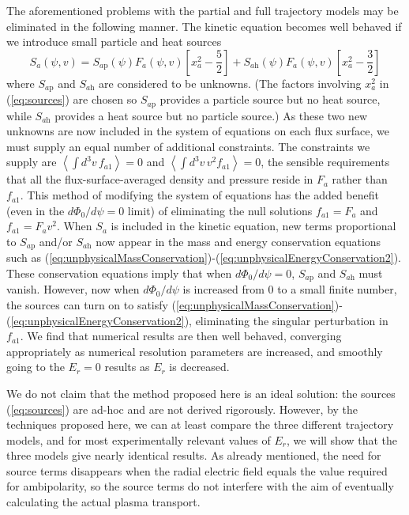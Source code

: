 \documentclass[12pt]{revtex4}
\newcommand{\Sap}{S_{a\mathrm{p}}}
\newcommand{\Sah}{S_{a\mathrm{h}}}
\begin{document}
The aforementioned problems with the partial and full trajectory models may be eliminated 
in the following manner.
The kinetic equation becomes well behaved if we introduce small particle and heat sources
\begin{equation}
S_a(\psi, v) = \Sap(\psi) F_{a}(\psi,v) \left[ x_a^2 - \frac{5}{2}\right] + \Sah(\psi) F_a(\psi, v) \left[x_a^2 - \frac{3}{2}\right]
\label{eq:sources}
\end{equation}
where $\Sap$ and $\Sah$ are considered to be unknowns.
(The factors involving $x_a^2$ in (\ref{eq:sources}) are chosen so $\Sap$ provides a particle source but no heat source, while $\Sah$ provides
a heat source but no particle source.)
As these two new unknowns are now included in the system of equations on each flux surface, we must supply an equal number of additional constraints.
The constraints we supply are $\left< \int d^3v\, f_{a1}\right>=0$ and $\left< \int d^3v\, v^2 f_{a1}\right>=0$,
the sensible requirements that all the flux-surface-averaged density and pressure reside in $F_a$ rather than $f_{a1}$.
This method of modifying the system of equations has the added benefit 
(even in the $d\Phi_0/d\psi=0$ limit)
of eliminating the null solutions $f_{a1} = F_a$ and $f_{a1} = F_a v^2$.
When $S_a$ is included in the kinetic equation, new terms proportional to $\Sap$ and/or $\Sah$
now appear in the mass and energy conservation equations such as (\ref{eq:unphysicalMassConservation})-(\ref{eq:unphysicalEnergyConservation2}).
These conservation equations imply that when $d\Phi_0/d\psi=0$, $\Sap$ and $\Sah$ must vanish.
However, now when $d\Phi_0/d\psi$ is increased from 0 to a small finite number, the sources can turn on
to satisfy  (\ref{eq:unphysicalMassConservation})-(\ref{eq:unphysicalEnergyConservation2}),
eliminating the singular perturbation in $f_{a1}$.  We find that numerical results are then well behaved,
converging appropriately as numerical resolution parameters are increased, and smoothly going to the
$E_r=0$ results as $E_r$ is decreased.

We do not claim that the method proposed here is an ideal solution: the sources (\ref{eq:sources})
are ad-hoc and are not derived rigorously. However, by the techniques proposed here, we can at least
compare the three different trajectory models, and for most experimentally relevant values of $E_r$, we will show
that the three models give nearly identical results. As already mentioned, the need for source terms disappears when the radial electric field equals the value required for ambipolarity, so the source terms do not interfere with the aim of eventually calculating the actual plasma transport. 
\end{document}
